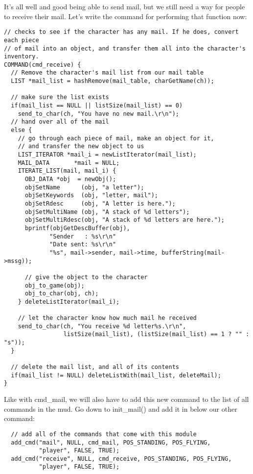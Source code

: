 \documentclass[12pt]{article}
\begin{document}
It's all well and good being able to send mail, but we still need a way for people to receive their mail. Let's write the command for performing that function now:

{\bf \begin{verbatim}
// checks to see if the character has any mail. If he does, convert each piece
// of mail into an object, and transfer them all into the character's inventory.
COMMAND(cmd_receive) {
  // Remove the character's mail list from our mail table
  LIST *mail_list = hashRemove(mail_table, charGetName(ch));

  // make sure the list exists
  if(mail_list == NULL || listSize(mail_list) == 0)
    send_to_char(ch, "You have no new mail.\r\n");
  // hand over all of the mail
  else {
    // go through each piece of mail, make an object for it, 
    // and transfer the new object to us
    LIST_ITERATOR *mail_i = newListIterator(mail_list);
    MAIL_DATA       *mail = NULL;
    ITERATE_LIST(mail, mail_i) {
      OBJ_DATA *obj  = newObj();
      objSetName      (obj, "a letter");
      objSetKeywords  (obj, "letter, mail");
      objSetRdesc     (obj, "A letter is here.");
      objSetMultiName (obj, "A stack of %d letters");
      objSetMultiRdesc(obj, "A stack of %d letters are here.");
      bprintf(objGetDescBuffer(obj),
             "Sender   : %s\r\n"
             "Date sent: %s\r\n"
             "%s", mail->sender, mail->time, bufferString(mail->mssg));
      
      // give the object to the character
      obj_to_game(obj);
      obj_to_char(obj, ch);
    } deleteListIterator(mail_i);

    // let the character know how much mail he received
    send_to_char(ch, "You receive %d letter%s.\r\n", 
                 listSize(mail_list), (listSize(mail_list) == 1 ? "" : "s"));
  }
  
  // delete the mail list, and all of its contents
  if(mail_list != NULL) deleteListWith(mail_list, deleteMail);
}
\end{verbatim}}

Like with cmd\_mail, we will also have to add this new command to the list of all commands in the mud. Go down to init\_mail() and add it in below our other command:

{\bf \begin{verbatim}
  // add all of the commands that come with this module
  add_cmd("mail", NULL, cmd_mail, POS_STANDING, POS_FLYING,
          "player", FALSE, TRUE);
  add_cmd("receive", NULL, cmd_receive, POS_STANDING, POS_FLYING,
          "player", FALSE, TRUE);
\end{verbatim}}
  
\end{document}
